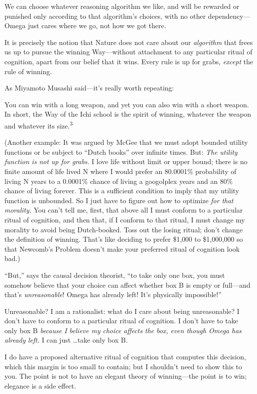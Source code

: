 {
 We can choose whatever reasoning algorithm we like, and will be
rewarded or punished only according to that algorithm's
choices, with no other dependency---Omega just cares where we go, not
how we got there.}

{
 It is precisely the notion that Nature does not care about our
\textit{algorithm} that frees us up to pursue the winning Way---without
attachment to any particular ritual of cognition, apart from our belief
that it wins. Every rule is up for grabs, \textit{except} the rule of
winning.}

{
 As Miyamoto Musashi said---it's really worth
repeating:}

{
 You can win with a long weapon, and yet you can also win with a
short weapon. In short, the Way of the Ichi school is the spirit of
winning, whatever the weapon and whatever its size.\textsuperscript{3}}

{
 (Another example: It was argued by McGee that we must adopt
bounded utility functions or be subject to ``Dutch
books'' over infinite times. But: \textit{The utility
function is not up for grabs.} I love life without limit or upper
bound; there is no finite amount of life lived N where I would prefer
an 80.0001\% probability of living N years to a 0.0001\% chance of
living a googolplex years and an 80\% chance of living forever. This is
a sufficient condition to imply that my utility function is unbounded.
So I just have to figure out how to optimize \textit{for that
morality.} You can't tell me, first, that above all I
must conform to a particular ritual of cognition, and then that, if I
conform to that ritual, I must change my morality to avoid being
Dutch-booked. Toss out the losing ritual; don't change
the definition of winning. That's like deciding to
prefer \$1,000 to \$1,000,000 so that Newcomb's Problem
doesn't make your preferred ritual of cognition look
bad.)}

{
 ``But,'' says the causal
decision theorist, ``to take only one box, you must
somehow believe that your choice can affect whether box B is empty or
full---and that's \textit{unreasonable}! Omega has
already left! It's physically
impossible!''}

{
 Unreasonable? I am a rationalist: what do I care about being
unreasonable? I don't have to conform to a particular
ritual of cognition. I don't have to take only box B
\textit{because I believe my choice affects the box, even though Omega
has already left.} I can just \ldots take only box B.}

{
 I do have a proposed alternative ritual of cognition that computes
this decision, which this margin is too small to contain; but I
shouldn't need to show this to you. The point is not to
have an elegant theory of winning---the point is to win; elegance is a
side effect.}

